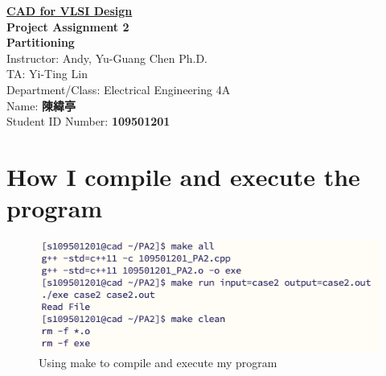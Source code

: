 \documentclass{article}
\begin{document}
\thispagestyle{empty}

\begin{center}
        \vspace*{3cm} %
        {\Huge\bf
            \underline{CAD for VLSI Design }\\}%
        \vspace{3cm}
        {\bf\huge Project Assignment 2\\}
        \vspace{0.5cm}
        {\bf\fontsize{23pt}{20}\selectfont Partitioning\\}
        \vspace{4cm}
        {\fontsize{23pt}{26pt} \selectfont Instructor: Andy, Yu-Guang Chen  Ph.D.\\}
        {\fontsize{20pt}{26pt} \selectfont TA: Yi-Ting Lin\\}
        \vspace{2cm}
        \fontsize{22pt}{25pt}\selectfont
        Department/Class: Electrical Engineering 4A\\
        \vspace*{1em}
        Name: {\bf 陳緯亭}\\
        \vspace*{1em}
        Student ID Number: {\bf 109501201}\\
\vspace{2cm}
\end{center}
\newpage


\tableofcontents
\listoflistings


\thispagestyle{empty}
\newpage


 \setcounter{page}{1}




\section{How I compile and execute the program}

\begin{figure}[H]
  \centering
  \includegraphics[width=\linewidth]{./img/2024-04-23-12-39-30.png}
  \caption{Using make to compile and execute
  my program}
  \label{g++}
\end{figure}
\end{document}
